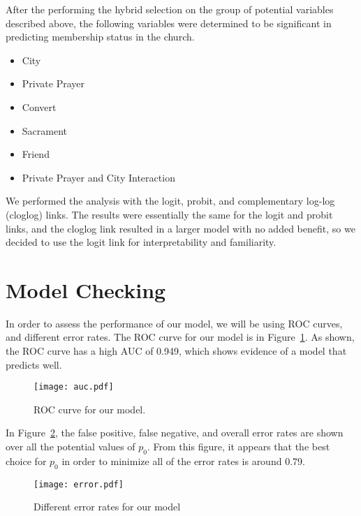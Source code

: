 \documentclass[11pt]{article}
\begin{document}
After the performing the hybrid selection on the group of potential variables described above, the following variables were determined to be significant in predicting membership status in the church.
\begin{itemize}
\item{City}
\item{Private Prayer}
\item{Convert}
\item{Sacrament}
\item{Friend}
\item{Private Prayer and City Interaction}
\end{itemize}
We performed the analysis with the logit, probit, and complementary log-log (cloglog) links. The results were essentially the same for the logit and probit links, and the cloglog link resulted in a larger model with no added benefit, so we decided to use the logit link for interpretability and familiarity.

\section*{Model Checking}
In order to assess the performance of our model, we will be using ROC curves, and different error rates. The ROC curve for our model is in Figure~\ref{roc}. As shown, the ROC curve has a high AUC of 0.949, which shows evidence of a model that predicts well.
\begin{figure}[ht]
\begin{center}
\texttt{[image: auc.pdf]} \vspace{-5mm}
\caption{ROC curve for our model.} \label{roc}
\end{center}
\end{figure}

\vspace{-3mm}
In Figure~\ref{error}, the false positive, false negative, and overall error rates are shown over all the potential values of $p_0$. From this figure, it appears that the best choice for $p_0$ in order to minimize all of the error rates is around 0.79.
\vspace{-3mm}
\begin{figure}[ht]
\begin{center}
\texttt{[image: error.pdf]} \vspace{-5mm}
\caption{Different error rates for our model} \label{error}
\end{center}
\end{figure}
\end{document}
